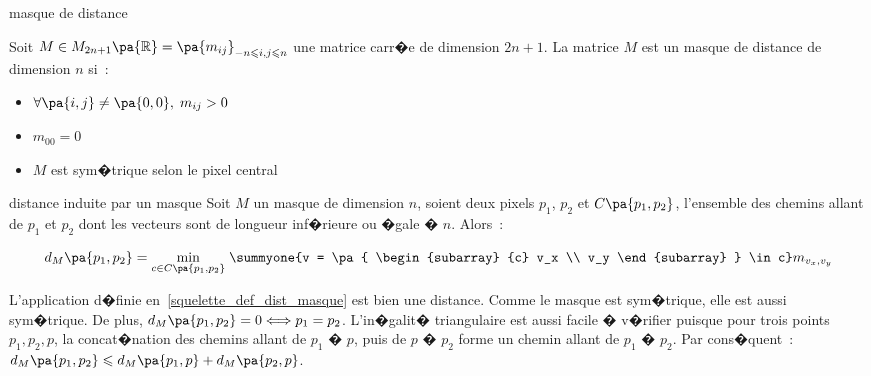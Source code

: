         \begin{xdefinition}{masque de distance}
        
        Soit $M \in M_{2n+1}\pa{\mathbb{R}} = \pa{m_{ij}}_{ -n \leqslant i,j \leqslant n}$ une matrice carr�e 
        de dimension $2n+1$. La matrice $M$ est un masque de distance de dimension $n$ si~:
        
                \begin{itemize}
                \item  $\forall \pa{i,j} \neq \pa{0,0}, \; m_{ij} > 0$
                \item  $m_{00} = 0$
                \item  $M$ est sym�trique selon le pixel central
                \end{itemize}
        
        \end{xdefinition}





            \begin{xdefinition}{distance induite par un masque}
            \label{squelette_def_dist_masque}
            Soit $M$ un masque de dimension $n$, soient deux pixels $p_1$, $p_2$ et $C\pa{p_1,p_2}$, 
            l'ensemble des chemins allant de $p_1$ et $p_2$ dont les vecteurs sont de longueur inf�rieure ou 
            �gale � $n$. Alors~:
            
                        $$
                        d_M\pa{p_1,p_2} = \underset{c \in C\pa{p_1,p_2}}{\min} \; \summyone{v = \pa{ \begin{subarray} {c}
                                    v_x \\ v_y \end{subarray} }
                                    \in c} m_{v_x, v_y}
                        $$
            
            \end{xdefinition}


L'application d�finie en~\ref{squelette_def_dist_masque} est bien une distance. Comme le masque est sym�trique, elle est aussi  sym�trique. De plus, $d_M\pa{p_1,p_2} = 0 \Longleftrightarrow p_1 = p_2$. L'in�galit� triangulaire est aussi facile � v�rifier puisque pour trois points $p_1,p_2,p$, la concat�nation des chemins allant de $p_1$ � $p$, puis de $p$ � $p_2$ forme un chemin allant de $p_1$ � $p_2$. Par cons�quent~: $d_M\pa{p_1,p_2} \leqslant d_M\pa{p_1,p} + d_M\pa{p_2,p}$.


